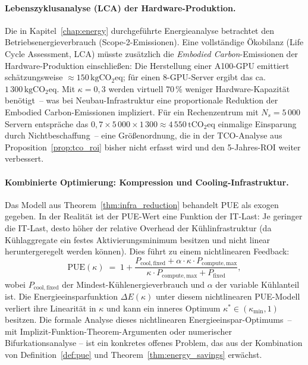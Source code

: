 \documentclass[12pt, a4paper, openany]{report}
\begin{document}
\paragraph{Lebenszyklusanalyse (LCA) der Hardware-Produktion.}
Die in Kapitel~\ref{chap:energy} durchgeführte Energieanalyse betrachtet
den Betriebsenergieverbrauch (Scope-2-Emissionen).  Eine vollständige
Ökobilanz (Life Cycle Assessment, LCA) müsste zusätzlich die
\emph{Embodied Carbon}-Emissionen der Hardware-Produktion einschließen:
Die Herstellung einer A100-GPU emittiert schätzungsweise
$\approx 150\,\mathrm{kgCO_2eq}$; für einen 8-GPU-Server ergibt das
ca.\,$1\,300\,\mathrm{kgCO_2eq}$.  Mit $\kappa = 0{,}3$ werden virtuell
70\,\% weniger Hardware-Kapazität benötigt~-- was bei Neubau-Infrastruktur
eine proportionale Reduktion der Embodied Carbon-Emissionen impliziert.
Für ein Rechenzentrum mit $N_s = 5\,000$ Servern entspräche das
$0{,}7 \times 5\,000 \times 1\,300 \approx 4\,550\,\mathrm{tCO_2eq}$
einmalige Einsparung durch Nichtbeschaffung~-- eine Größenordnung, die in
der TCO-Analyse aus Proposition~\ref{prop:tco_roi} bisher nicht erfasst
wird und den 5-Jahres-ROI weiter verbessert.

\paragraph{Kombinierte Optimierung: Kompression und Cooling-Infrastruktur.}
Das Modell aus Theorem~\ref{thm:infra_reduction} behandelt PUE als exogen
gegeben.  In der Realität ist der PUE-Wert eine Funktion der IT-Last:
Je geringer die IT-Last, desto höher der relative Overhead der
Kühlinfrastruktur (da Kühlaggregate ein festes Aktivierungsminimum besitzen
und nicht linear heruntergeregelt werden können).  Dies führt zu einem
nichtlinearen Feedback:
\[
  \mathrm{PUE}(\kappa)
  \;=\; 1 + \frac{P_{\mathrm{cool,fixed}} + \alpha \cdot \kappa \cdot P_{\mathrm{compute,max}}}
                  {\kappa \cdot P_{\mathrm{compute,max}} + P_{\mathrm{fixed}}},
\]
wobei $P_{\mathrm{cool,fixed}}$ der Mindest-Kühlenergieverbrauch und $\alpha$
der variable Kühlanteil ist.  Die Energieeinsparfunktion $\Delta E(\kappa)$
unter diesem nichtlinearen PUE-Modell verliert ihre Linearität in $\kappa$
und kann ein inneres Optimum $\kappa^* \in (\kappa_{\min}, 1)$ besitzen.
Die formale Analyse dieses nichtlinearen Energieeinspar-Optimums~-- mit
Implizit-Funktion-Theorem-Argumenten oder numerischer Bifurkationsanalyse
-- ist ein konkretes offenes Problem, das aus der Kombination von
Definition~\ref{def:pue} und Theorem~\ref{thm:energy_savings} erwächst.
\end{document}
